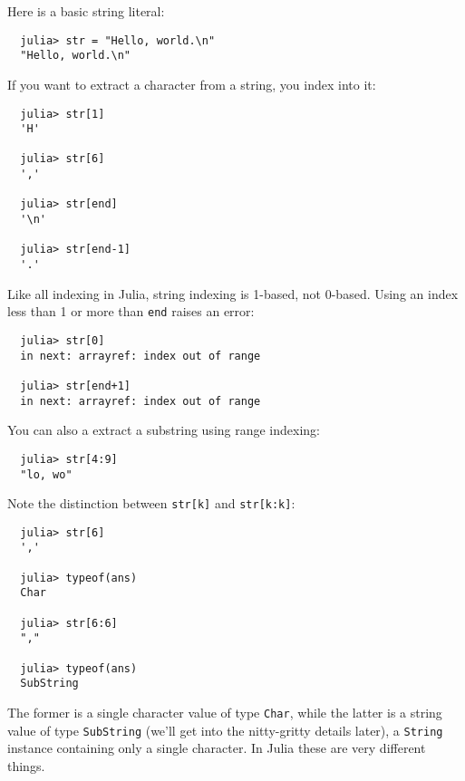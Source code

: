 \documentclass{article}
\begin{document}
Here is a basic string literal:
\begin{verbatim}
  julia> str = "Hello, world.\n"
  "Hello, world.\n"
\end{verbatim}
If you want to extract a character from a string, you index into it:
\begin{verbatim}
  julia> str[1]
  'H'

  julia> str[6]
  ','

  julia> str[end]
  '\n'

  julia> str[end-1]
  '.'
\end{verbatim}
Like all indexing in Julia, string indexing is 1-based, not 0-based.
Using an index less than 1 or more than \verb|end| raises an error:
\begin{verbatim}
  julia> str[0]
  in next: arrayref: index out of range

  julia> str[end+1]
  in next: arrayref: index out of range
\end{verbatim}
You can also a extract a substring using range indexing:
\begin{verbatim}
  julia> str[4:9]
  "lo, wo"
\end{verbatim}
Note the distinction between \verb|str[k]| and \verb|str[k:k]|:
\begin{verbatim}
  julia> str[6]
  ','

  julia> typeof(ans)
  Char

  julia> str[6:6]
  ","

  julia> typeof(ans)
  SubString
\end{verbatim}
The former is a single character value of type \verb|Char|, while the latter is a string value of type \verb|SubString| (we'll get into the nitty-gritty details later), a \verb|String| instance containing only a single character.
In Julia these are very different things.
\end{document}
